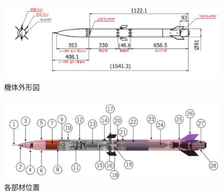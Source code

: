 \documentclass[a4paper,11pt,uplatex]{jsarticle}
\begin{document}
\begin{figure}[H]
	\centering
	\includegraphics[width=1.1\linewidth]{pic_str/s_sunpou.png}
	\caption{機体外形図}
	\label{s_gaikei}
\end{figure}

\begin{figure}[H]
	\centering
	\includegraphics{pic_str/s_iti.png}
	\caption{各部材位置}
	\label{s_iti}
\end{figure}
\end{document}
